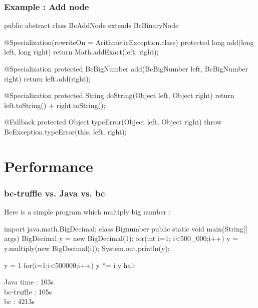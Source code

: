 \documentclass[11pt,handout]{beamer}
\begin{document}
\begin{frame}[fragile]
  \frametitle{Example : Add node}
\begin{scalacode}
  public abstract class BcAddNode extends BcBinaryNode {

    @Specialization(rewriteOn = ArithmeticException.class)
    protected long add(long left, long right) {
        return Math.addExact(left, right);
    }

    @Specialization
    protected BcBigNumber add(BcBigNumber left, BcBigNumber right) {
      return left.add(right);
    }

    @Specialization
    protected String doString(Object left, Object right) {
      return left.toString() + right.toString();
    }

    @Fallback
    protected Object typeError(Object left, Object right) {
      throw BcException.typeError(this, left, right);
    }
  }
\end{scalacode}
\end{frame}

\section[Performance]{Performance}

\begin{frame}[fragile]
  \frametitle{bc-truffle vs. Java vs. bc}
  Here is a simple program which multiply big number :

  \begin{minipage}[t]{0.64\textwidth}
\begin{javacode}
import java.math.BigDecimal;
class Bignumber {
  public static void main(String[] args) {
    BigDecimal y = new BigDecimal(1);
    for(int i=1; i<500_000;i++) {
      y = y.multiply(new BigDecimal(i));
    }
    System.out.println(y);
  }
}
\end{javacode}
  \end{minipage}
  \hfill
  \begin{minipage}[t]{0.35\textwidth}
\begin{bccode}
  y = 1
  for(i=1;i<500000;i++)
    y *= i
  y
  halt
\end{bccode}
  \end{minipage}
  
  \begin{center}
  Java time  : 103s  \\
  bc-truffle : 105s  \\
  bc         : 4213s \\
  \end{center}
\end{frame}
\end{document}
